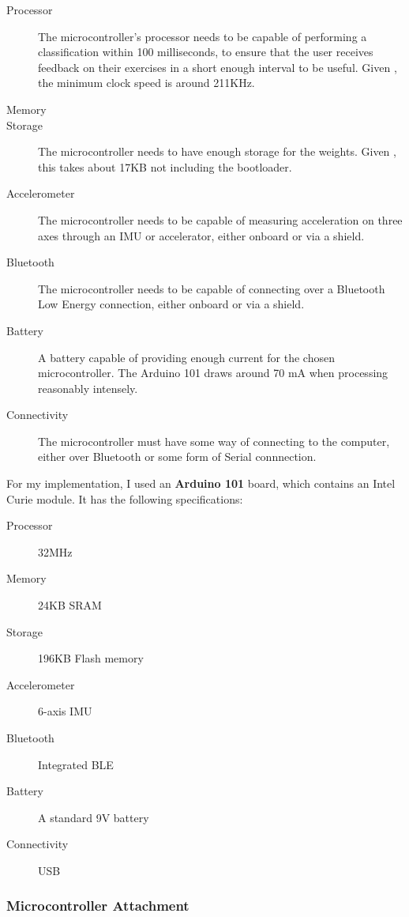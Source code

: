 \documentclass[a4paper]{article}
\begin{document}
\begin{description}
\item[Processor] The microcontroller's processor needs to be capable of performing a classification within 100 milliseconds, to ensure that the user receives feedback on their exercises in a short enough interval to be useful. Given , the minimum clock speed is around 211KHz.\cite{dsref0}
\item[Memory] 
\item[Storage] The microcontroller needs to have enough storage for the weights. Given , this takes about 17KB not including the bootloader\cite{dsref2}.
\item[Accelerometer] The microcontroller needs to be capable of measuring acceleration on three axes through an IMU or accelerator, either onboard or via a shield.
\item[Bluetooth] The microcontroller needs to be capable of connecting over a Bluetooth Low Energy connection, either onboard or via a shield.
\item[Battery] A battery capable of providing enough current for the chosen microcontroller. The Arduino 101 draws around 70 mA when processing reasonably intensely.\cite{dsref3}
\item[Connectivity] The microcontroller must have some way of connecting to the computer, either over Bluetooth or some form of Serial connnection.
\end{description}

For my implementation, I used an \textbf{Arduino 101} board, which contains an Intel Curie module. It has the following specifications:\cite{dsref4}

\begin{description}
\item[Processor] 32MHz
\item[Memory] 24KB SRAM
\item[Storage] 196KB Flash memory
\item[Accelerometer] 6-axis IMU
\item[Bluetooth] Integrated BLE 
\item[Battery] A standard 9V battery
\item[Connectivity] USB
\end{description}

\subsubsection{Microcontroller Attachment}
\end{document}
